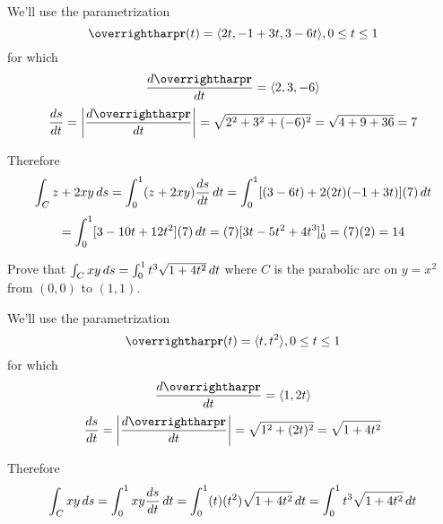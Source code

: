 \documentclass[letterpaper, twoside, 12pt]{book}
\begin{document}
          \begin{solution}
            We'll use the parametrization
              \[
                \vect{r}(t)
                  =
                \<2t,-1+3t,3-6t\>,
                0\leq t\leq 1
              \]
            for which
              \[
                \frac{d\vect{r}}{dt}
                  =
                \<2,3,-6\>
              \]
              \[
                \frac{ds}{dt}
                  =
                \left|\frac{d\vect{r}}{dt}\right|
                  =
                \sqrt{2^2+3^2+(-6)^2}
                  =
                \sqrt{4+9+36}
                  =
                7
              \]

            Therefore
              \[
                \int_C z + 2xy\,d{s}
                  =
                \int_0^1 (z + 2xy)\frac{ds}{dt}\,d{t}
                  =
                \int_0^1 [(3-6t) + 2(2t)(-1+3t)](7)\,d{t}
              \]
              \[
                  =
                \int_0^1 [3-10t+12t^2](7)\,d{t}
                  =
                (7)[3t-5t^2+4t^3]_0^1
                  =
                (7)(2)
                  =
                14
              \]
          \end{solution}

          \begin{problem}
            Prove that $\int_C xy\,d{s}=\int_0^1 t^3\sqrt{1+4t^2}\,d{t}$
            where $C$ is the parabolic arc
            on $y=x^2$ from $(0,0)$ to $(1,1)$.
          \end{problem}

          \begin{solution}
            We'll use the parametrization
              \[
                \vect{r}(t)
                  =
                \<t,t^2\>,
                0\leq t\leq 1
              \]
            for which
              \[
                \frac{d\vect{r}}{dt}
                  =
                \<1,2t\>
              \]
              \[
                \frac{ds}{dt}
                  =
                \left|\frac{d\vect{r}}{dt}\right|
                  =
                \sqrt{1^2+(2t)^2}
                  =
                \sqrt{1+4t^2}
              \]

            Therefore
              \[
                \int_C xy\,d{s}
                  =
                \int_0^1 xy\frac{ds}{dt}\,d{t}
                  =
                \int_0^1 (t)(t^2)\sqrt{1+4t^2}\,d{t}
                  =
                \int_0^1 t^3\sqrt{1+4t^2}\,d{t}
              \]
          \end{solution}
\end{document}
